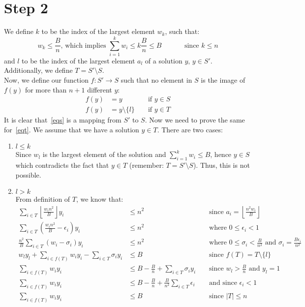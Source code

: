 \documentclass[a4paper]{article}
\begin{document}
\section*{Step 2}
We define $k$ to be the index of the largest element $w_k$, such that:
\begin{equation*}
    w_k \leq \frac{B}{n} \text{, which implies } \sum_{i=1}^{k}w_i \leq k \frac{B}{n} \leq B \hspace{3em} \text{ since } k \leq n
\end{equation*}
and $l$ to be the index of the largest element $a_l$ of a solution $y$, $y \in S'$.
Additionally, we define $T = S' \setminus S$. \\
Now, we define our function $f: S' \rightarrow S$ such that no element in $S$ is the image of $f(y)$ for more than $n+1$ different $y$:
\begin{align}
    f(y) & = y && \text{ if } y \in S \label{eqs} \\
    f(y) & = y \setminus \{ l \} && \text{ if } y \in T \label{eqt}
\end{align}
It is clear that~\eqref{eqs} is a mapping from $S'$ to $S$. Now we need to prove the same for~\eqref{eqt}.
We assume that we have a solution $y \in T$.
There are two cases:
\begin{enumerate}
\item $l \leq k$ \\
Since $w_l$ is the largest element of the solution and $\sum_{i=1}^{k}w_i \leq B$, hence $y \in S$ which contradicts the fact that $y \in T$ (remember: $T = S' \setminus S$). Thus, this is not possible.

\item $l > k$ \\
From definition of $T$, we know that:
\begin{align*}
    \sum_{i \in T} \left \lfloor \frac{w_in^2}{B} \right \rfloor y_i & \leq n^2 && \text{ since } a_i = \left \lfloor \frac{n^2w_i}{B} \right \rfloor \\
    \sum_{i \in T} \left ( \frac{w_in^2}{B} - \epsilon_i \right ) y_i & \leq n^2 && \text{ where } 0 \leq \epsilon_i < 1 \\
    \frac{n^2}{B} \sum_{i \in T} \left ( w_i - \sigma_i \right ) y_i & \leq n^2 && \text{ where } 0 \leq \sigma_i < \frac{B}{n^2} \text{ and } \sigma_i = \frac{B\epsilon_i}{n^2} \\
    w_ly_l + \sum_{i \in f(T)} w_iy_i - \sum_{i \in T} \sigma_iy_i & \leq B && \text{ since } f(T) = T \setminus \{ l \} \\
    \sum_{i \in f(T)} w_iy_i & \leq B - \frac{B}{n} + \sum_{i \in T} \sigma_iy_i && \text{ since } w_l > \frac{B}{n} \text{ and } y_l = 1 \\
    \sum_{i \in f(T)} w_iy_i & \leq B - \frac{B}{n} + \frac{B}{n^2} \sum_{i \in T} \epsilon_i && \text{ and since } \epsilon_i < 1\\
    \sum_{i \in f(T)} w_iy_i & \leq B  && \text{ since } |T| \leq n \tag{\theequation}\label{eq2}
\end{align*}
\end{enumerate}
\end{document}
